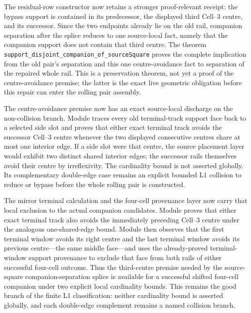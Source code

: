 \documentclass[11pt]{article}
\theoremstyle{definition}
\begin{document}
The residual-row constructor now retains a stronger proof-relevant receipt:
the bypass support is contained in its predecessor, the displayed third
Cell--3 centre, and its successor.  Since the two endpoints already lie on the
old rail, companion separation after the splice reduces to one source-local
fact, namely that the companion support does not contain that third centre.
The theorem
\texttt{support\_disjoint\_companion\_of\_sourceSquare} proves the complete
implication from the old pair's separation and this one centre-avoidance fact
to separation of the repaired whole rail.  This is a preservation theorem,
not yet a proof of the centre-avoidance premise; the latter is the exact live
geometric obligation before this repair can enter the rolling pair assembly.

The centre-avoidance premise now has an exact source-local discharge on the
non-collision branch.  Module
traces every old terminal-track support face back to a selected side slot and
proves that either exact terminal track avoids the successor Cell--3 centre
whenever the two displayed consecutive centres share at most one interior
edge.  If a side slot were that centre, the source placement layer would
exhibit two distinct shared interior edges; the successor rails themselves
avoid their centre by irreflexivity.  The cardinality bound is not asserted
globally.  Its complementary double-edge case remains an explicit bounded L1
collision to reduce or bypass before the whole rolling pair is constructed.

The mirror terminal calculation and the four-cell provenance layer now carry
that local exclusion to the actual companion candidates.  Module
proves that either exact terminal track also avoids the immediately preceding
Cell--3 centre under the analogous one-shared-edge bound.  Module
then observes that the first terminal window avoids its right centre and the
last terminal window avoids its previous centre---the same middle face---and
uses the already-proved terminal-window support provenance to exclude that
face from both rails of either successful four-cell outcome.  Thus the
third-centre premise needed by the source-square companion-separation splice
is available for a successful shifted four-cell companion under two explicit
local cardinality bounds.  This remains the good branch of the finite L1
classification: neither cardinality bound is asserted globally, and each
double-edge complement remains a named collision branch.
\end{document}
